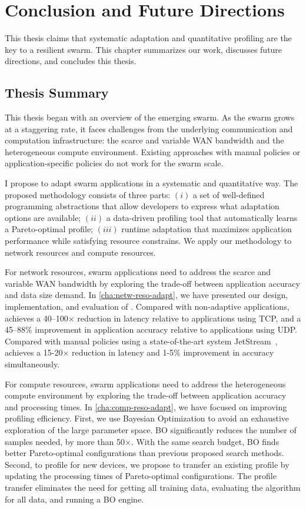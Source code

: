 \documentclass[thesis.tex]{subfiles}
\begin{document}
\chapter{Conclusion and Future Directions}
\label{cha:concl-future-work}

This thesis claims that systematic adaptation and quantitative profiling are the
key to a resilient swarm. This chapter summarizes our work, discusses future
directions, and concludes this thesis.

\section{Thesis Summary}
\label{sec:thesis-summary-1}

This thesis began with an overview of the emerging swarm. As the swarm grows at
a staggering rate, it faces challenges from the underlying communication and
computation infrastructure: the scarce and variable WAN bandwidth and the
heterogeneous compute environment. Existing approaches with manual policies or
application-specific policies do not work for the swarm scale.

I propose to adapt swarm applications in a systematic and quantitative way. The
proposed methodology consists of three parts: $(i)$ a set of well-defined
programming abstractions that allow developers to express what adaptation
options are available; $(ii)$ a data-driven profiling tool that automatically
learns a Pareto-optimal profile; $(iii)$ runtime adaptation that maximizes
application performance while satisfying resource constrains. We apply our
methodology to network resources and compute resources.

For network resources, swarm applications need to address the scarce and
variable WAN bandwidth by exploring the trade-off between application accuracy
and data size demand. In \autoref{cha:netw-reso-adapt}, we have presented our
design, implementation, and evaluation of \awstream{}. Compared with
non-adaptive applications, \awstream{} achieves a 40--100$\times$ reduction in
latency relative to applications using TCP, and a 45--88\% improvement in
application accuracy relative to applications using UDP. Compared with manual
policies using a state-of-the-art system JetStream~\cite{rabkin2014aggregation},
\awstream{} achieves a 15-20$\times$ reduction in latency and 1-5\% improvement
in accuracy simultaneously.

For compute resources, swarm applications need to address the heterogeneous
compute environment by exploring the trade-off between application accuracy and
processing times. In \autoref{cha:comp-reso-adapt}, we have focused on improving
profiling efficiency. First, we use Bayesian Optimization to avoid an exhaustive
exploration of the large parameter space. BO significantly reduces the number of
samples needed, by more than 50$\times$. With the same search budget, BO finds
better Pareto-optimal configurations than previous proposed search
methods. Second, to profile for new devices, we propose to transfer an existing
profile by updating the processing times of Pareto-optimal configurations. The
profile transfer eliminates the need for getting all training data, evaluating
the algorithm for all data, and running a BO engine.
\end{document}

